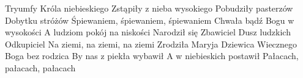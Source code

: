 \beginverse
Tryumfy Króla niebieskiego
Zstąpiły z nieba wysokiego
Pobudziły pasterzów
Dobytku stróżów
Śpiewaniem, śpiewaniem, śpiewaniem
\endverse
\beginverse
Chwała bądź Bogu w wysokości
A ludziom pokój na niskości
Narodził się Zbawiciel
Dusz ludzkich Odkupiciel
Na ziemi, na ziemi, na ziemi
\endverse
\beginverse
Zrodziła Maryja Dziewica
Wiecznego Boga bez rodzica
By nas z piekła wybawił
A w niebieskich postawił
Pałacach, pałacach, pałacach
\endverse
\endsong